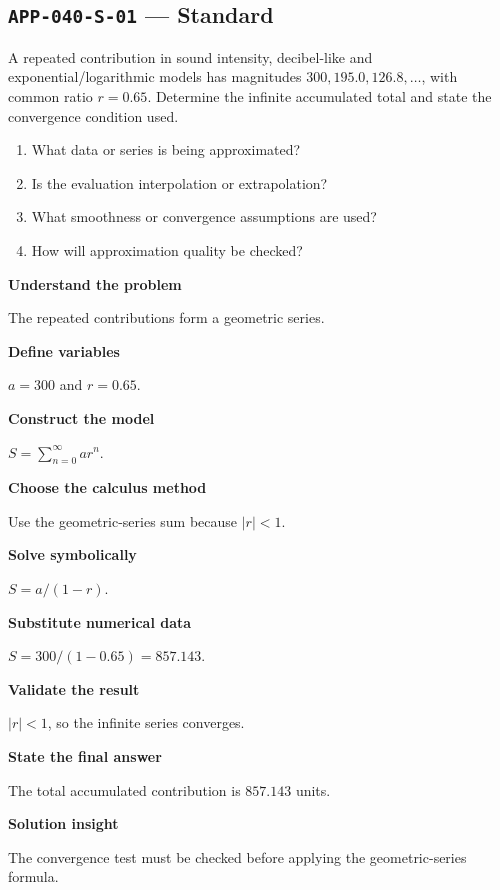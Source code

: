\documentclass[11pt]{book}
\newcommand{\pid}[1]{\texttt{#1}}
\begin{document}
\subsection*{\pid{APP-040-S-01} — Standard}
\begin{problembox}
A repeated contribution in sound intensity, decibel-like and exponential/logarithmic models has magnitudes $300, 195.0, 126.8,\ldots$, with common ratio $r=0.65$. Determine the infinite accumulated total and state the convergence condition used.
\end{problembox}
\begin{promptbox}\begin{enumerate}
\item What data or series is being approximated?
\item Is the evaluation interpolation or extrapolation?
\item What smoothness or convergence assumptions are used?
\item How will approximation quality be checked?
\end{enumerate}\end{promptbox}
\begin{solutionbox}
\textbf{Understand the problem}\par The repeated contributions form a geometric series.\par\medskip
\textbf{Define variables}\par $a=300$ and $r=0.65$.\par\medskip
\textbf{Construct the model}\par $S=\sum_{n=0}^{\infty}ar^n$.\par\medskip
\textbf{Choose the calculus method}\par Use the geometric-series sum because $|r|<1$.\par\medskip
\textbf{Solve symbolically}\par $S=a/(1-r)$.\par\medskip
\textbf{Substitute numerical data}\par $S=300/(1-0.65)=857.143$.\par\medskip
\textbf{Validate the result}\par $|r|<1$, so the infinite series converges.\par\medskip
\textbf{State the final answer}\par The total accumulated contribution is $857.143$ units.\par\medskip
\textbf{Solution insight}\par The convergence test must be checked before applying the geometric-series formula.\par\medskip
\end{solutionbox}
\end{document}
